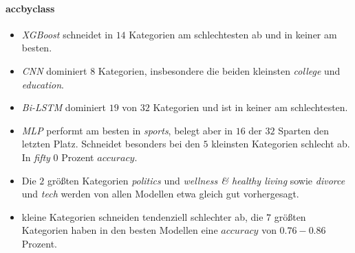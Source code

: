 \documentclass[a4paper,11pt]{article}
\begin{document}
\paragraph{accbyclass}
\begin{itemize}
    \item \textit{XGBoost} schneidet in $14$ Kategorien am schlechtesten ab und in keiner am besten.
     \item \textit{CNN} dominiert $8$ Kategorien, insbesondere die beiden kleinsten \textit{college} und \textit{education}.
    \item \textit{Bi-LSTM} dominiert $19$ von $32$ Kategorien und ist in keiner am schlechtesten.
    \item \textit{MLP} performt am besten in \textit{sports}, belegt aber in $16$ der $32$ Sparten den letzten Platz. Schneidet besonders bei den $5$ kleinsten Kategorien schlecht ab. In  \textit{fifty} $0$ Prozent $accuracy$.
    \item Die $2$ größten Kategorien \textit{politics} und \textit{wellness \& healthy living} sowie \textit{divorce} und \textit{tech} werden von  allen Modellen etwa gleich gut vorhergesagt.
    \item kleine Kategorien schneiden tendenziell schlechter ab, die $7$ größten Kategorien haben in den besten Modellen eine $accuracy$ von $0.76- 0.86$ Prozent.
\end{itemize}{}
\end{document}
